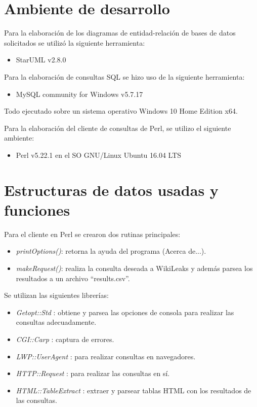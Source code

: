 \documentclass{article}
\begin{document}
\section{Ambiente de desarrollo}
Para la elaboraci\'on de los diagramas de entidad-relaci\'on de bases de datos solicitados se utiliz\'o la siguiente herramienta:
\begin{itemize}
  \item StarUML v2.8.0
\end{itemize}

Para la elaboraci\'on de consultas SQL se hizo uso de la siguiente herramienta:
\begin{itemize}
  \item MySQL community for Windows v5.7.17
\end{itemize}
Todo ejecutado sobre un sistema operativo Windows 10 Home Edition x64.

Para la elaboraci\'on del cliente de consultas de Perl, se utilizo el siguiente ambiente:
\begin{itemize}
  \item Perl v5.22.1 en el SO GNU/Linux Ubuntu 16.04 LTS
\end{itemize}

\section{Estructuras de datos usadas y funciones}
Para el cliente en Perl se crearon dos rutinas principales:
\begin{itemize}
  \item \emph{printOptions()}: retorna la ayuda del programa (Acerca de...).
  \item \emph{makeRequest()}: realiza la consulta deseada a WikiLeaks y adem\'as parsea los resultados a un archivo ``results.csv''.
\end{itemize}

Se utilizan las siguientes librer\'ias:
\begin{itemize}
  \item \emph{Getopt::Std} : obtiene y parsea las opciones de consola para realizar las consultas adecuadamente.
  \item \emph{CGI::Carp} : captura de errores.
  \item \emph{LWP::UserAgent} : para realizar consultas en navegadores.
  \item \emph{HTTP::Request} : para realizar las consultas en s\'i.
  \item \emph{HTML::TableExtract} : extraer y parsear tablas HTML con los resultados de las consultas.
\end{itemize}
\end{document}
